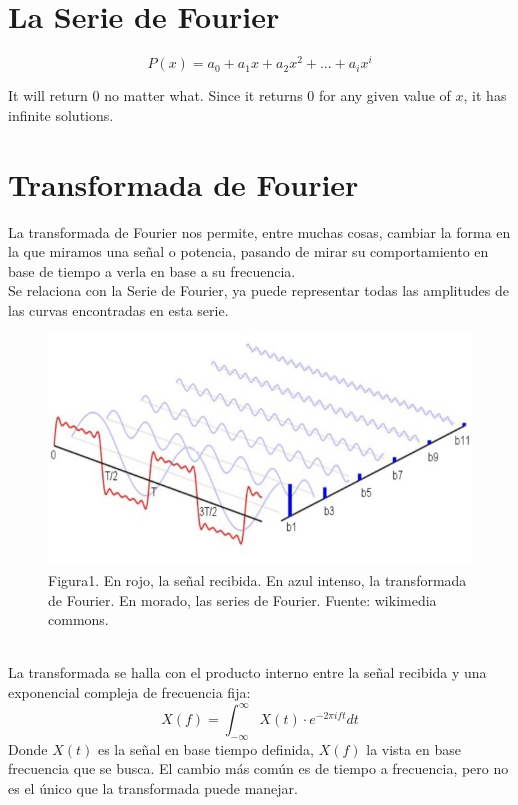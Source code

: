 \documentclass[preprint,review,12pt]{elsarticle}
\begin{document}
\section{La Serie de Fourier}

\[
    P(x) = a_0 + a_1x + a_2x^2 + ...  + a_ix^i
\]

It will return 0 no matter what. Since it returns 0 for any given value of $x$, it has infinite solutions.\cite{1137202}
\label{S:1}

\section{Transformada de Fourier}
La transformada de Fourier nos permite, entre muchas cosas, cambiar la forma en 
la que miramos una señal o potencia, pasando de mirar su comportamiento en 
base de tiempo a verla en base a su frecuencia.\\
Se relaciona con la Serie de Fourier, ya puede representar todas las
amplitudes de las curvas encontradas en esta serie.\\
\begin{figure}[h]
    \centering
    \includegraphics[scale=0.5]{Figuras/Serie-transformada.jpg}
    \\
    \small Figura1. En rojo, la señal recibida. En azul intenso, la transformada
    de Fourier. En morado, las series de Fourier. Fuente: wikimedia commons.\\
\end{figure}\\
La transformada se halla con el producto interno entre la señal recibida y una
exponencial compleja de frecuencia fija:\\
\begin{equation}
    X(f) = \int_{- \infty}^{\infty} X(t) \cdot e^{-2\pi ift} dt 
\end{equation}
Donde $X(t)$ es la señal en base tiempo definida, $X(f)$ la vista en base frecuencia
que se busca. El cambio más común es de tiempo a frecuencia, pero no es el único que la 
transformada puede manejar.\\
\end{document}
